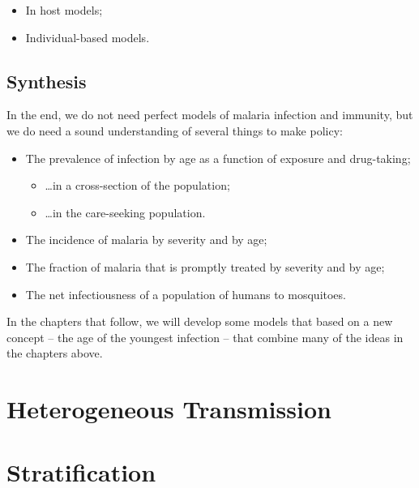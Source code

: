 \documentclass[
]{book}
\begin{document}
\begin{itemize}
\item
  In host models;
\item
  Individual-based models.
\end{itemize}

\hypertarget{synthesis}{%
\subsection{Synthesis}\label{synthesis}}

In the end, we do not need perfect models of malaria infection and immunity, but we do need a sound understanding of several things to make policy:

\begin{itemize}
\item
  The prevalence of infection by age as a function of exposure and drug-taking;

  \begin{itemize}
  \item
    \ldots in a cross-section of the population;
  \item
    \ldots in the care-seeking population.
  \end{itemize}
\item
  The incidence of malaria by severity and by age;
\item
  The fraction of malaria that is promptly treated by severity and by age;
\item
  The net infectiousness of a population of humans to mosquitoes.
\end{itemize}

In the chapters that follow, we will develop some models that based on a new concept -- the age of the youngest infection -- that combine many of the ideas in the chapters above.

\hypertarget{heterogeneous-transmission}{%
\section{Heterogeneous Transmission}\label{heterogeneous-transmission}}

\hypertarget{stratification}{%
\section{Stratification}\label{stratification}}
\end{document}
